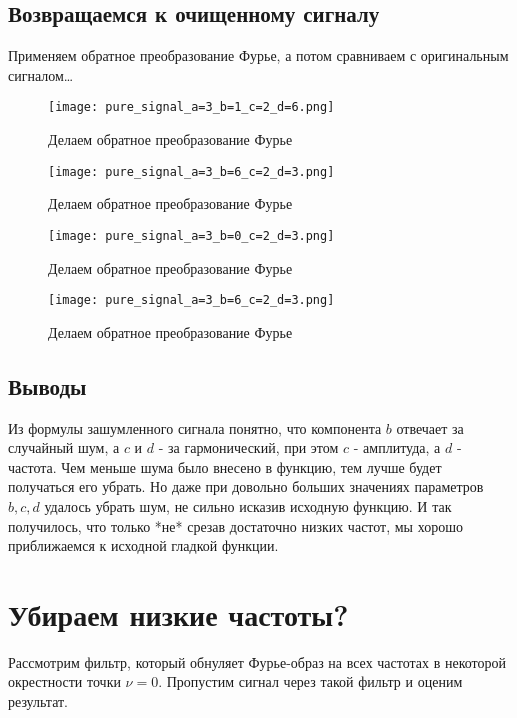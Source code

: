 \newpage
\newpage
\subsection{Возвращаемся к очищенному сигналу}
Применяем обратное преобразование Фурье, а потом сравниваем с оригинальным сигналом\dots

\begin{figure}[ht]
    \centering
    \texttt{[image: pure\_signal\_a=3\_b=1\_c=2\_d=6.png]}
    \caption{Делаем обратное преобразование Фурье}
\end{figure}

\begin{figure}[ht]
    \centering
    \texttt{[image: pure\_signal\_a=3\_b=6\_c=2\_d=3.png]}
    \caption{Делаем обратное преобразование Фурье}
\end{figure}

\begin{figure}[ht]
    \centering
    \texttt{[image: pure\_signal\_a=3\_b=0\_c=2\_d=3.png]}
    \caption{Делаем обратное преобразование Фурье}
\end{figure}

\begin{figure}[ht]
    \centering
    \texttt{[image: pure\_signal\_a=3\_b=6\_c=2\_d=3.png]}
    \caption{Делаем обратное преобразование Фурье}
\end{figure}

\newpage
\subsection{Выводы}

Из формулы зашумленного сигнала понятно, что компонента $b$ отвечает за случайный шум, а $c$ и $d$ - за
гармонический, при этом $c$ - амплитуда, а $d$ - частота. Чем меньше шума было внесено в функцию, тем лучше будет получаться
его убрать. Но даже при довольно больших значениях параметров $b, c, d$ удалось убрать шум,
не сильно исказив исходную функцию. И так получилось, что только *не* срезав достаточно низких частот, мы хорошо приближаемся к исходной гладкой функции.

\newpage
\section{Убираем низкие частоты?}

Рассмотрим фильтр, который обнуляет Фурье-образ на всех частотах в некоторой окрестности точки $\nu = 0$. 
Пропустим сигнал через такой фильтр и оценим результат.


